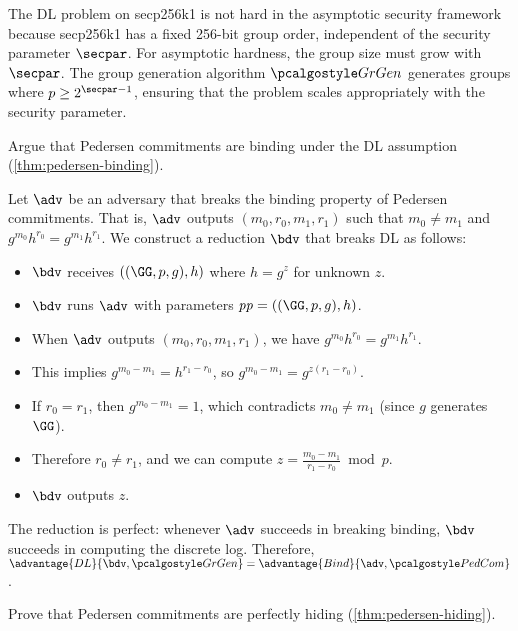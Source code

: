 \ifsolutions
\begin{mysolution}
  The DL problem on secp256k1 is not hard in the asymptotic security framework because secp256k1 has a fixed 256-bit group order, independent of the security parameter $\secpar$.
  For asymptotic hardness, the group size must grow with $\secpar$.
  The group generation algorithm $\grgen$ generates groups where $p \geq 2^{\secpar-1}$, ensuring that the problem scales appropriately with the security parameter.
\end{mysolution}
\fi

\begin{exercise}\label{ex:pedersen-binding}
  Argue that Pedersen commitments are binding under the DL assumption (\autoref{thm:pedersen-binding}).
\end{exercise}

\ifsolutions
\begin{mysolution}
  Let $\adv$ be an adversary that breaks the binding property of Pedersen commitments.
  That is, $\adv$ outputs $(m_0, r_0, m_1, r_1)$ such that $m_0 \neq m_1$ and $g^{m_0}h^{r_0} = g^{m_1}h^{r_1}$.
  We construct a \ppt reduction $\bdv$ that breaks DL as follows:
  \begin{itemize}
    \item $\bdv$ receives $(\gparam, h)$ where $h = g^z$ for unknown $z$.
    \item $\bdv$ runs $\adv$ with parameters $\params = (\gparam, h)$.
    \item When $\adv$ outputs $(m_0, r_0, m_1, r_1)$, we have $g^{m_0}h^{r_0} = g^{m_1}h^{r_1}$.
    \item This implies $g^{m_0 - m_1} = h^{r_1 - r_0}$, so $g^{m_0 - m_1} = g^{z(r_1 - r_0)}$.
    \item If $r_0 = r_1$, then $g^{m_0 - m_1} = 1$, which contradicts $m_0 \neq m_1$ (since $g$ generates $\GG$).
    \item Therefore $r_0 \neq r_1$, and we can compute $z = \frac{m_0 - m_1}{r_1 - r_0} \bmod p$.
    \item $\bdv$ outputs $z$.
  \end{itemize}
  The reduction is perfect: whenever $\adv$ succeeds in breaking binding, $\bdv$ succeeds in computing the discrete log.
  Therefore, $\advantage{DL}{\bdv, \grgen} = \advantage{Bind}{\adv, \algo{PedCom}}$.
\end{mysolution}
\fi

\begin{exercise}\label{ex:pedersen-hiding}
  Prove that Pedersen commitments are perfectly hiding (\autoref{thm:pedersen-hiding}).
\end{exercise}

